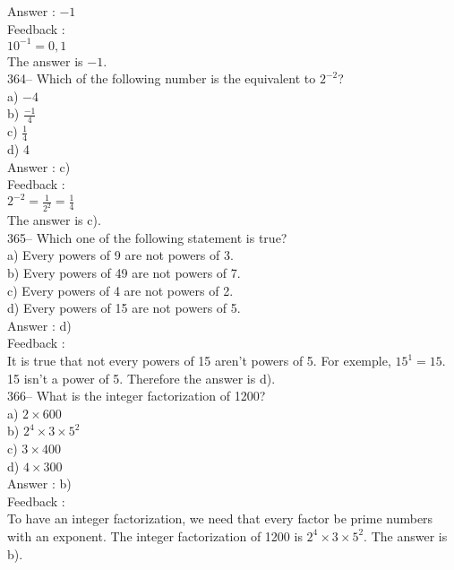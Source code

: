 ﻿\documentclass[letterpaper, 12pt]{article}
\begin{document}
Answer : $-1$\\

Feedback : \\
$10^{-1}=0,1$\\
The answer is $-1$.\\

364-- Which of the following number is the equivalent to $2^{-2}$?\\
a) $-4$\\[2mm]
b) $\frac{-1}{4}$\\[2mm]
c) $\frac{1}{4}$\\[2mm]
d) 4\\

Answer : c)\\

Feedback : \\
$2^{-2}=\frac{1}{2^{2}}=\frac{1}{4}$\\[2mm]
The answer is c).\\

365-- Which one of the following statement is true?\\
a) Every powers of 9 are not powers of 3.\\
b) Every powers of 49 are not powers of 7.\\
c) Every powers of 4 are not powers of 2.\\
d) Every powers of 15 are not powers of 5.\\

Answer : d)\\

Feedback : \\
It is true that not every powers of 15 aren't powers of 5.
  For exemple, $15^{1}=15$. 15 isn't a power of 5.  Therefore the answer is d).\\

366-- What is the integer factorization of 1200?\\
a) $2\times600$\\
b) $2^{4}\times3\times5^{2}$\\
c) $3\times 400$\\
d) $4\times300$\\

Answer : b)\\

Feedback : \\
To have an integer factorization, we need that every factor be prime numbers with an exponent. The integer factorization of 1200 is $2^{4}\times3\times5^{2}$.  The answer is b).\\
\end{document}
